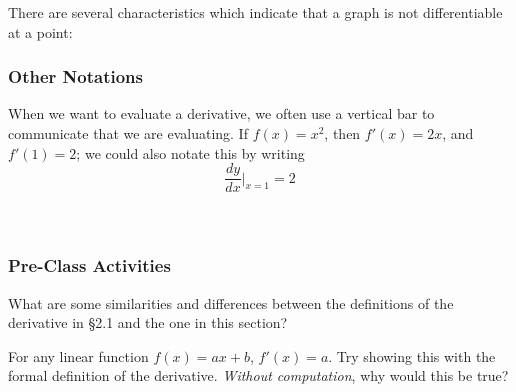 \documentclass[notes]{subfiles}
\begin{document}
		There are several characteristics which indicate that a graph is not differentiable at a point:
		
	\subsubsection*{Other Notations}
		\begin{rmk}
		\end{rmk}
		
		When we want to evaluate a derivative, we often use a vertical bar to communicate that we are evaluating.  If $f(x) = x^2$, then $f'(x) = 2x$, and $f'(1) = 2$; we could also notate this by writing
		\[\dfrac{dy}{dx}\bigg\rvert_{x = 1} = 2\]	
			 \\
		\newsec $ $

	\subsubsection*{Pre-Class Activities}
		\begin{ex}
			What are some similarities and differences between the definitions of the derivative in \S2.1 and the one in this section?
		\end{ex}
			\newpage
			
		\begin{ex}
			For any linear function $f(x) = ax + b$, $f'(x) = a$.  Try showing this with the formal definition of the derivative.  \emph{Without computation}, why would this be true?
		\end{ex}
			
\end{document}
